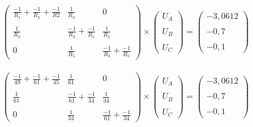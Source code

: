 \begin{gather*}
    \begin{pmatrix}
        \frac{-1}{R_1}+\frac{-1}{R_3}+\frac{-1}{R2}&\frac{1}{R_3} & 0 \\\\
        \frac{1}{R_3}&\frac{-1}{R_3}+\frac{-1}{R_5}  & \frac{1}{R_5} \\\\
        0&\frac{1}{R_5} &\frac{-1}{R_3}+\frac{-1}{R_5}
    \end{pmatrix}
    \times
    \begin{pmatrix}
        U_A \\\\
        U_B \\\\
        U_C
    \end{pmatrix}
    =
    \begin{pmatrix}
        -3,0612 \\\\
        -0,7 \\\\
        -0,1
    \end{pmatrix}
\end{gather*}

\vspace{0.75cm}

\begin{gather*}
    \begin{pmatrix}
        \frac{-1}{49}+\frac{-1}{61}+\frac{-1}{45}&\frac{1}{61} & 0 \\\\
        \frac{1}{61}&\frac{-1}{61}+\frac{-1}{34}  & \frac{1}{34} \\\\
        0&\frac{1}{34} &\frac{-1}{61}+\frac{-1}{34}
    \end{pmatrix}
    \times
    \begin{pmatrix}
        U_A \\\\
        U_B \\\\
        U_C
    \end{pmatrix}
    =
    \begin{pmatrix}
        -3,0612 \\\\
        -0,7 \\\\
        -0,1
    \end{pmatrix}
\end{gather*}

